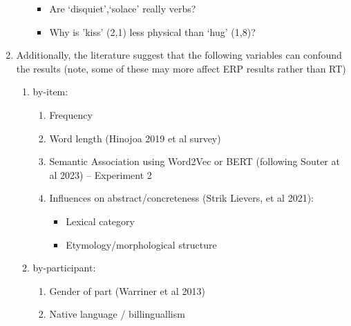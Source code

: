 \documentclass[12pt,letterpaper,table,svgnames,dvipsnames]{article}
\begin{document}
\begin{enumerate}
\begin{enumerate}
\begin{itemize}
                    \item Are `disquiet',`solace' really verbs?


                    \item Why is 'kiss' (2,1) less physical than `hug' (1,8)?

                \end{itemize}


        \end{enumerate}

    \item Additionally, the literature suggest that the following variables can confound the results (note, some of these may more affect ERP results rather than RT)

            \begin{enumerate}
                \item by-item:
                \begin{enumerate}[noitemsep]
                    \item Frequency

                    \item Word length (Hinojoa 2019 et al survey)

                    \item Semantic Association using Word2Vec or BERT (following Souter at al 2023) -- Experiment 2

                    \item Influences on abstract/concreteness (Strik Lievers, et al 2021):
                        \begin{itemize}[noitemsep]
                            \item Lexical category
                            \item Etymology/morphological structure
                        \end{itemize}

                \end{enumerate}

            \item by-participant:
                \begin{enumerate}[noitemsep]
                    \item Gender of part (Warriner et al 2013)

                    \item Native language /  billinguallism
                \end{enumerate}



\end{enumerate}
\end{enumerate}
\end{document}
